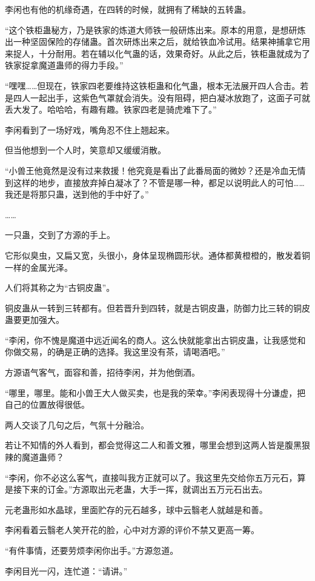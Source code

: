 \begin{this_body}
李闲也有他的机缘奇遇，在四转的时候，就拥有了稀缺的五转蛊。

“这个铁柜蛊秘方，乃是铁家的炼道大师铁一般研炼出来。原本的用意，是想研炼出一种坚固保险的存储蛊。首次研炼出来之后，就给铁血冷试用。结果神捕拿它用来捉人，十分耐用。若在辅以化气蛊的话，效果奇好。从此之后，铁柜蛊就成为了铁家捉拿魔道蛊师的得力手段。”

“嘿嘿……但现在，铁家四老要维持这铁柜蛊和化气蛊，根本无法展开四人合击。若是四人一起出手，这紫色气罩就会消失。没有阻碍，把白凝冰放跑了，这面子可就丢大发了。哈哈哈，有趣有趣。铁家四老是骑虎难下了。”

李闲看到了一场好戏，嘴角忍不住上翘起来。

但当他想到一个人时，笑意却又缓缓消散。

“小兽王他竟然是没有过来救援！他究竟是看出了此番局面的微妙？还是冷血无情到这样的地步，直接放弃掉白凝冰了？不管是哪一种，都足以说明此人的可怕……我还是将那只蛊，送到他的手中好了。”

……

一只蛊，交到了方源的手上。

它形似臭虫，又扁又宽，头很小，身体呈现椭圆形状。通体都黄橙橙的，散发着铜一样的金属光泽。

人们将其称之为“古铜皮蛊”。

铜皮蛊从一转到三转都有。但若晋升到四转，就是古铜皮蛊，防御力比三转的铜皮蛊要更加强大。

“李闲，你不愧是魔道中远近闻名的商人。这么快就能拿出古铜皮蛊，让我感觉和你做交易，的确是正确的选择。我这里没有茶，请喝酒吧。”

方源语气客气，面容和善，招待李闲，并为他倒酒。

“哪里，哪里。能和小兽王大人做买卖，也是我的荣幸。”李闲表现得十分谦虚，把自己的位置放得很低。

两人交谈了几句之后，气氛十分融洽。

若让不知情的外人看到，都会觉得这二人和善文雅，哪里会想到这两人皆是腹黑狠辣的魔道蛊师？

“李闲，你不必这么客气，直接叫我方正就可以了。我这里先交给你五万元石，算是接下来的订金。”方源取出元老蛊，大手一挥，就调出五万元石出去。

元老蛊形如水晶球，里面贮存的元石越多，球中云翳老人就越是和善。

李闲看着云翳老人笑开花的脸，心中对方源的评价不禁又更高一筹。

“有件事情，还要劳烦李闲你出手。”方源忽道。

李闲目光一闪，连忙道：“请讲。”


\end{this_body}

